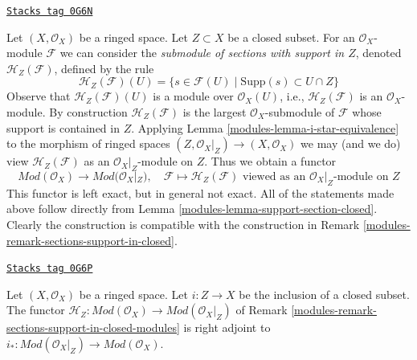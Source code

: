 \begin{remark}
\label{modules-remark-sections-support-in-closed-modules}
\href{https://stacks.math.columbia.edu/tag/0G6N}{\texttt{Stacks tag 0G6N}}

Let $(X, \mathcal{O}_X)$ be a ringed space. Let $Z \subset X$ be
a closed subset. For an $\mathcal{O}_X$-module $\mathcal{F}$ we can
consider the {\it submodule of sections with support in $Z$}, denoted
$\mathcal{H}_Z(\mathcal{F})$, defined by the rule
$$
\mathcal{H}_Z(\mathcal{F})(U) =
\{s \in \mathcal{F}(U) \mid \text{Supp}(s) \subset U \cap Z\}
$$
Observe that $\mathcal{H}_Z(\mathcal{F})(U)$ is a module over
$\mathcal{O}_X(U)$, i.e., $\mathcal{H}_Z(\mathcal{F})$ is an
$\mathcal{O}_X$-module. By construction $\mathcal{H}_Z(\mathcal{F})$
is the largest $\mathcal{O}_X$-submodule of $\mathcal{F}$ whose support is
contained in $Z$.
Applying Lemma \ref{modules-lemma-i-star-equivalence} to
the morphism of ringed spaces $(Z, \mathcal{O}_X|_Z) \to (X, \mathcal{O}_X)$ we
may (and we do) view
$\mathcal{H}_Z(\mathcal{F})$ as an $\mathcal{O}_X|_Z$-module on $Z$.
Thus we obtain a functor
$$
\textit{Mod}(\mathcal{O}_X) \longrightarrow \textit{Mod}(\mathcal{O}_X|_Z),
\quad
\mathcal{F} \longmapsto \mathcal{H}_Z(\mathcal{F})
\text{ viewed as an }\mathcal{O}_X|_Z\text{-module on }Z
$$
This functor is left exact, but in general not exact.
All of the statements made above follow directly from
Lemma \ref{modules-lemma-support-section-closed}.
Clearly the construction is compatible with the construction in
Remark \ref{modules-remark-sections-support-in-closed}.
\end{remark}

\begin{lemma}
\label{modules-lemma-adjoint-section-with-support}
\href{https://stacks.math.columbia.edu/tag/0G6P}{\texttt{Stacks tag 0G6P}}

Let $(X, \mathcal{O}_X)$ be a ringed space. Let $i : Z \to X$ be the
inclusion of a closed subset. The functor
$\mathcal{H}_Z : \textit{Mod}(\mathcal{O}_X) \to
\textit{Mod}(\mathcal{O}_X|_Z)$ of
Remark \ref{modules-remark-sections-support-in-closed-modules}
is right adjoint to
$i_* : \textit{Mod}(\mathcal{O}_X|_Z) \to \textit{Mod}(\mathcal{O}_X)$.
\end{lemma}

